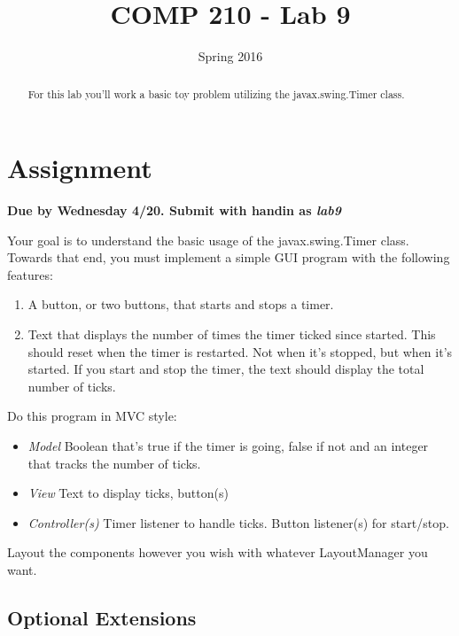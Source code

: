 \documentclass[nobib]{tufte-handout}
\title{COMP 210 - Lab 9}
\date{Spring 2016}
\begin{document}
 
\maketitle

\begin{abstract}
For this lab you'll work a basic toy problem utilizing the javax.swing.Timer class.
\end{abstract}

\section{Assignment}

\begin{center}
\textbf{Due by Wednesday 4/20. Submit with handin as \textit{lab9}}
\end{center}

Your goal is to understand the basic usage of the javax.swing.Timer class. Towards that end, you must implement a simple GUI program with the following features:
\begin{enumerate}
\item A button, or two buttons, that starts and stops a timer.
\item Text that displays the number of times the timer ticked since started. This should reset when the timer is restarted. Not when it's stopped, but when it's started. If you start and stop the timer, the text should display the total number of ticks.
\end{enumerate} 

Do this program in MVC style:    
\begin{itemize}
\item \textit{Model} Boolean that's true if the timer is going, false if not and an integer that tracks the number of ticks.
\item \textit{View} Text to display ticks, button(s)
\item \textit{Controller(s)} Timer listener to handle ticks.  Button listener(s) for start/stop.
\end{itemize}

Layout the components however you wish with whatever LayoutManager you want.

\subsection{Optional Extensions}
\end{document}
